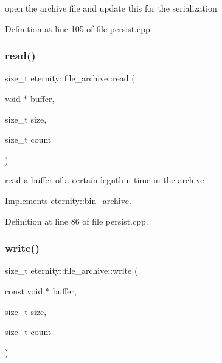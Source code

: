 open the archive file and update this for the serialization 



Definition at line 105 of file persist.\+cpp.

\mbox{\label{classeternity_1_1file__archive_a307b43ac9f06c7077ac0f7e48dc0d7ab}} 
\subsubsection{\texorpdfstring{read()}{read()}}
{\footnotesize\ttfamily size\+\_\+t eternity\+::file\+\_\+archive\+::read (\begin{DoxyParamCaption}\item[{void $\ast$}]{buffer,  }\item[{size\+\_\+t}]{size,  }\item[{size\+\_\+t}]{count }\end{DoxyParamCaption})\hspace{0.3cm}{\ttfamily [virtual]}}



read a buffer of a certain legnth n time in the archive 



Implements \hyperlink{classeternity_1_1bin__archive_a5d67b032541f5a1e104d2fcd0eaa7a55}{eternity\+::bin\+\_\+archive}.



Definition at line 86 of file persist.\+cpp.

\mbox{\label{classeternity_1_1file__archive_a0eaf4b5937b3ff46df3627f64efc19e8}} 
\subsubsection{\texorpdfstring{write()}{write()}}
{\footnotesize\ttfamily size\+\_\+t eternity\+::file\+\_\+archive\+::write (\begin{DoxyParamCaption}\item[{const void $\ast$}]{buffer,  }\item[{size\+\_\+t}]{size,  }\item[{size\+\_\+t}]{count }\end{DoxyParamCaption})\hspace{0.3cm}{\ttfamily [virtual]}}



